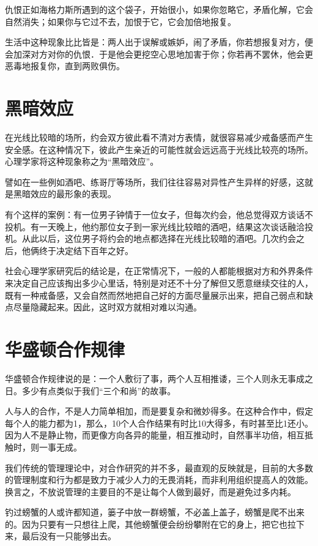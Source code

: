 \documentclass[11pt]{ctexart}
\begin{document}
仇恨正如海格力斯所遇到的这个袋子，开始很小，如果你忽略它，矛盾化解，它会自然消失；如果你与它过不去，加恨于它，它会加倍地报复。

生活中这种现象比比皆是：两人出于误解或嫉妒，闹了矛盾，你若想报复对方，便会加深对方对你的仇恨．于是他会更挖空心思地加害于你；你若再不罢休，他会更恶毒地报复你，直到两败俱伤。
\section{黑暗效应}
\label{sec-44}


在光线比较暗的场所，约会双方彼此看不清对方表情，就很容易减少戒备感而产生安全感。在这种情况下，彼此产生亲近的可能性就会远远高于光线比较亮的场所。心理学家将这种现象称之为“黑暗效应”。

譬如在一些例如酒吧、练哥厅等场所，我们往往容易对异性产生异样的好感，这就是黑暗效应的最形象的表现。

有个这样的案例：有一位男子钟情于一位女子，但每次约会，他总觉得双方谈话不投机。有一天晚上，他约那位女子到一家光线比较暗的酒吧，结果这次谈话融洽投机。从此以后，这位男子将约会的地点都选择在光线比较暗的酒吧。几次约会之后，他俩终于决定结下百年之好。

社会心理学家研究后的结论是，在正常情况下，一般的人都能根据对方和外界条件来决定自己应该掏出多少心里话，特别是对还不十分了解但又愿意继续交往的人，既有一种戒备感，又会自然而然地把自己好的方面尽量展示出来，把自己弱点和缺点尽量隐藏起来。因此，这时双方就相对难以沟通。
\section{华盛顿合作规律}
\label{sec-45}


华盛顿合作规律说的是：一个人敷衍了事，两个人互相推诿，三个人则永无事成之日。多少有点类似于我们“三个和尚”的故事。

人与人的合作，不是人力简单相加，而是要复杂和微妙得多。在这种合作中，假定每个人的能力都为1，那么，10个人合作结果有时比10大得多，有时甚至比1还小。因为人不是静止物，而更像方向各异的能量，相互推动时，自然事半功倍，相互抵触时，则一事无成。

我们传统的管理理论中，对合作研究的并不多，最直观的反映就是，目前的大多数的管理制度和行为都是致力于减少人力的无畏消耗，而非利用组织提高人的效能。换言之，不放说管理的主要目的不是让每个人做到最好，而是避免过多内耗。

钓过螃蟹的人或许都知道，篓子中放一群螃蟹，不必盖上盖子，螃蟹是爬不出来的。因为只要有一只想往上爬，其他螃蟹便会纷纷攀附在它的身上，把它也拉下来，最后没有一只能够出去。
\end{document}
